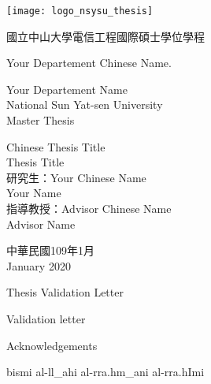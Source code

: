 \documentclass[12pt, twoside , openright]{book}
\begin{document}
\thispagestyle{empty}
\begin{center}
	\onehalfspacing
	\texttt{[image: logo\_nsysu\_thesis]}
	
	{\chinnesesize 國立中山大學電信工程國際碩士學位學程
		
		Your Departement Chinese Name.}
	
	{\bigsize Your Departement Name\\National Sun Yat-sen University\\}
	{\bigsize Master Thesis\\}
	
	\vspace{2cm}
	{\chinnesesize Chinese Thesis Title\\}
	{\bigsize Thesis Title\\}
	\vspace{2cm}
	{\bigsize 研究生：Your Chinese Name\\
		\hspace{70pt} Your Name\\
		指導教授：Advisor Chinese Name\\
		\hspace{130pt}Advisor Name \\
	}
	
	\vspace{1.5cm}
	
	{\bigsize 中華民國109年1月\\
		January 2020\\
		
	}
\end{center}
\frontmatter



\begin{center}
	{\chinnesesize Thesis Validation Letter }
\end{center}
Validation letter
\newpage
\mbox{}
\newpage


\begin{center}
	{\chinnesesize Acknowledgements}
\end{center}
\setarab
\fullvocalize
\arabtrue
\begin{center}
	\begin{RLtext}
		bismi al-ll_ahi al-rra.hm_ani al-rra.hImi
	\end{RLtext}
\end{center}
\end{document}
